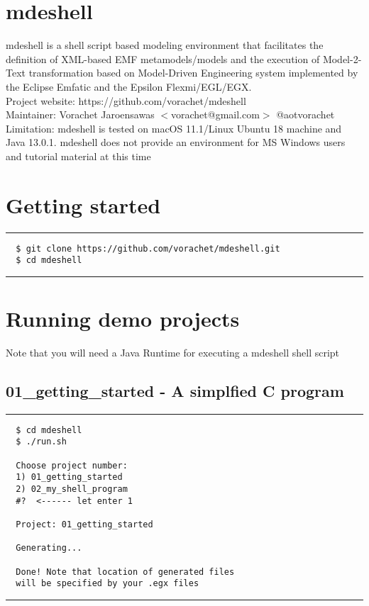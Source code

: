 \documentclass[12pt]{article}
\begin{document}

\section*{mdeshell}

mdeshell is a shell script based modeling environment that facilitates the definition of XML-based EMF metamodels/models and the execution of Model-2-Text transformation based on Model-Driven Engineering system implemented by the Eclipse Emfatic and the Epsilon Flexmi/EGL/EGX.  \\


Project website: https://github.com/vorachet/mdeshell \\
Maintainer: Vorachet Jaroensawas $<$vorachet@gmail.com$>$ @aotvorachet \\

Limitation: mdeshell is tested on macOS 11.1/Linux Ubuntu 18 machine and Java 13.0.1. mdeshell does not provide an environment for MS Windows users and tutorial material at this time 



\section*{Getting started}
\noindent\rule{8cm}{0.4pt}
\begin{lstlisting}
  $ git clone https://github.com/vorachet/mdeshell.git
  $ cd mdeshell
\end{lstlisting}
\noindent\rule{8cm}{0.4pt}


\section*{Running demo projects}

Note that you will need a Java Runtime for executing a mdeshell shell script 

\subsection*{01\_getting\_started - A simplfied C program}
\noindent\rule{8cm}{0.4pt}
\begin{lstlisting}
  $ cd mdeshell
  $ ./run.sh 

  Choose project number:
  1) 01_getting_started
  2) 02_my_shell_program
  #?  <------ let enter 1

  Project: 01_getting_started 

  Generating...

  Done! Note that location of generated files 
  will be specified by your .egx files
\end{lstlisting}
\noindent\rule{8cm}{0.4pt}
\end{document}
